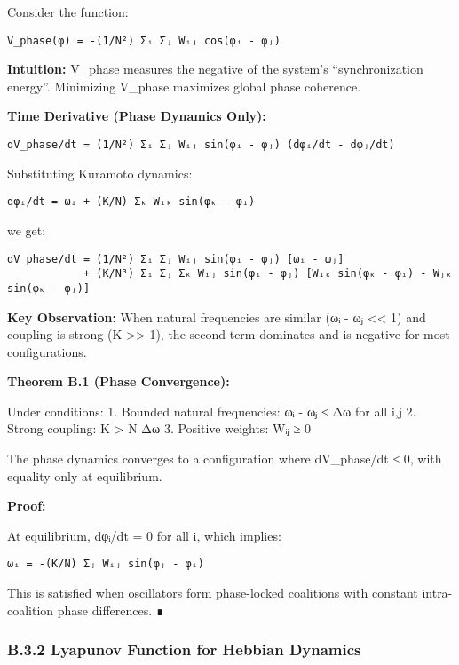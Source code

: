 \documentclass[
]{article}
\begin{document}
Consider the function:

\begin{verbatim}
V_phase(φ) = -(1/N²) Σᵢ Σⱼ Wᵢⱼ cos(φᵢ - φⱼ)
\end{verbatim}

\textbf{Intuition:} V\_phase measures the negative of the system's
``synchronization energy''. Minimizing V\_phase maximizes global phase
coherence.

\textbf{Time Derivative (Phase Dynamics Only):}

\begin{verbatim}
dV_phase/dt = (1/N²) Σᵢ Σⱼ Wᵢⱼ sin(φᵢ - φⱼ) (dφᵢ/dt - dφⱼ/dt)
\end{verbatim}

Substituting Kuramoto dynamics:

\begin{verbatim}
dφᵢ/dt = ωᵢ + (K/N) Σₖ Wᵢₖ sin(φₖ - φᵢ)
\end{verbatim}

we get:

\begin{verbatim}
dV_phase/dt = (1/N²) Σᵢ Σⱼ Wᵢⱼ sin(φᵢ - φⱼ) [ωᵢ - ωⱼ]
            + (K/N³) Σᵢ Σⱼ Σₖ Wᵢⱼ sin(φᵢ - φⱼ) [Wᵢₖ sin(φₖ - φᵢ) - Wⱼₖ sin(φₖ - φⱼ)]
\end{verbatim}

\textbf{Key Observation:} When natural frequencies are similar
(\textbar ωᵢ - ωⱼ\textbar{} \textless\textless{} 1) and coupling is
strong (K \textgreater\textgreater{} 1), the second term dominates and
is negative for most configurations.

\textbf{Theorem B.1 (Phase Convergence):}

Under conditions: 1. Bounded natural frequencies: \textbar ωᵢ -
ωⱼ\textbar{} ≤ Δω for all i,j 2. Strong coupling: K \textgreater{} N Δω
3. Positive weights: Wᵢⱼ ≥ 0

The phase dynamics converges to a configuration where dV\_phase/dt ≤ 0,
with equality only at equilibrium.

\textbf{Proof:}

At equilibrium, dφᵢ/dt = 0 for all i, which implies:

\begin{verbatim}
ωᵢ = -(K/N) Σⱼ Wᵢⱼ sin(φⱼ - φᵢ)
\end{verbatim}

This is satisfied when oscillators form phase-locked coalitions with
constant intra-coalition phase differences. ∎

\subsubsection{B.3.2 Lyapunov Function for Hebbian
Dynamics}\label{b.3.2-lyapunov-function-for-hebbian-dynamics}
\end{document}
